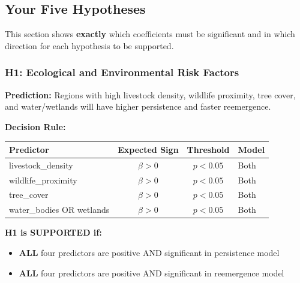 \documentclass[11pt,a4paper]{article}
\begin{document}
\subsection{Your Five Hypotheses}

This section shows \textbf{exactly} which coefficients must be significant and in which direction for each hypothesis to be supported.

\subsubsection{H1: Ecological and Environmental Risk Factors}

\textbf{Prediction:} Regions with high livestock density, wildlife proximity, tree cover, and water/wetlands will have higher persistence and faster reemergence.

\textbf{Decision Rule:}

\begin{table}[h]
\centering
\small
\begin{tabular}{@{}lccl@{}}
\toprule
\textbf{Predictor} & \textbf{Expected Sign} & \textbf{Threshold} & \textbf{Model} \\
\midrule
livestock\_density & $\beta > 0$ & $p < 0.05$ & Both \\
wildlife\_proximity & $\beta > 0$ & $p < 0.05$ & Both \\
tree\_cover & $\beta > 0$ & $p < 0.05$ & Both \\
water\_bodies OR wetlands & $\beta > 0$ & $p < 0.05$ & Both \\
\bottomrule
\end{tabular}
\end{table}

\textbf{H1 is SUPPORTED if:}
\begin{itemize}
    \item \textbf{ALL} four predictors are positive AND significant in persistence model
    \item \textbf{ALL} four predictors are positive AND significant in reemergence model
\end{itemize}
\end{document}
